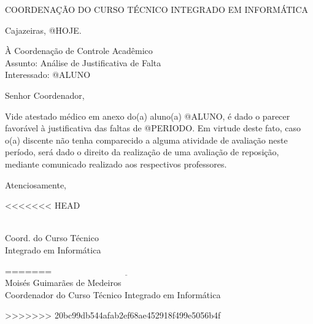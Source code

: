 \documentclass[a4paper, 12pt]{letter}
\begin{document}
{\bf
{\selectfont
    \begin{center}
        {\selectfont
            COORDENAÇÃO DO CURSO TÉCNICO INTEGRADO EM INFORMÁTICA
        }
    \end{center}
}

\begin{flushright}
Cajazeiras, @HOJE.
\end{flushright}

\noindent À Coordenação de Controle Acadêmico\\
Assunto: Análise de Justificativa de Falta\\
Interessado: @ALUNO

\noindent Senhor Coordenador,

\onehalfspacing Vide atestado médico em anexo do(a) aluno(a) @ALUNO, é dado o parecer favorável à justificativa das faltas de @PERIODO. Em virtude deste fato, caso o(a) discente não tenha comparecido a alguma atividade de avaliação neste período, será dado o direito da realização de uma avaliação de reposição, mediante comunicado realizado aos respectivos professores.

Atenciosamente,

<<<<<<< HEAD
\begin{flushright}
\\
\indent Coord. do Curso Técnico\\
\indent Integrado em Informática\\
\end{flushright}
=======
\indent $\underline{\hspace{7cm}}$\\
\indent Moisés Guimarães de Medeiros\\
\indent Coordenador do Curso Técnico Integrado em Informática\\
}
>>>>>>> 20bc99db544afab2ef68ae452918f499e5056b4f
\end{document}
